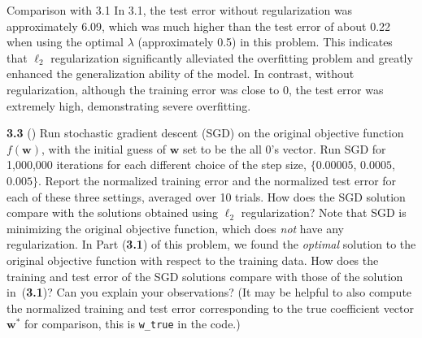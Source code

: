 {{Comparison with 3.1 
In 3.1, the test error without regularization was approximately 6.09, which was much higher than the test error of about 0.22 when using the optimal \(\lambda\) (approximately 0.5) in this problem. This indicates that $\ell_2$ regularization significantly alleviated the overfitting problem and greatly enhanced the generalization ability of the model. In contrast, without regularization, although the training error was close to 0, the test error was extremely high, demonstrating severe overfitting.

\bigskip

\textbf{3.3} () Run stochastic gradient descent (SGD) on the original objective
function $f(\mathbf{w})$, with the initial guess of $\textbf{w}$ set to be the all 0's vector.  Run SGD for 1,000,000 iterations for each different choice of the step size, $\{0.00005$, $0.0005$, $0.005\}$.  Report the
 normalized training error and the normalized test
error for each of these three settings, averaged over 10 trials. How does the SGD solution compare with the
solutions obtained using $\ell_2$ regularization? Note that SGD is
minimizing the original objective function, which does \emph{not} have any
regularization. In Part (\textbf{3.1}) of this problem, we found the
\emph{optimal} solution to the original objective function with
respect to the training data. How does the training and test error of
the SGD solutions compare with those of the solution in~(\textbf{3.1})? 
Can you explain your observations?   (It may be helpful to also compute the normalized training and test error corresponding to the true coefficient vector $\textbf{w}^*$ for comparison, this is \verb|w_true| in the code.)\\

}}
